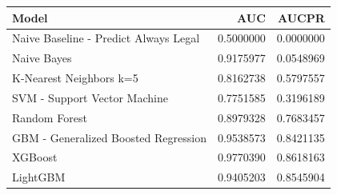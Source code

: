 \documentclass[]{article}
\begin{document}
\begin{table}[H]
\centering\begingroup\fontsize{10}{12}\selectfont

\begin{tabular}{l|r|r}
\hline
Model & AUC & AUCPR\\
\hline
Naive Baseline - Predict Always Legal & 0.5000000 & 0.0000000\\
\hline
Naive Bayes & 0.9175977 & 0.0548969\\
\hline
K-Nearest Neighbors k=5 & 0.8162738 & 0.5797557\\
\hline
SVM - Support Vector Machine & 0.7751585 & 0.3196189\\
\hline
Random Forest & 0.8979328 & 0.7683457\\
\hline
GBM - Generalized Boosted Regression & 0.9538573 & 0.8421135\\
\hline
XGBoost & 0.9770390 & 0.8618163\\
\hline
LightGBM & 0.9405203 & 0.8545904\\
\hline
\end{tabular}
\endgroup{}
\end{table}
\end{document}
